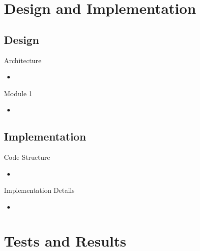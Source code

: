 \documentclass{beamer}
\begin{document}
\section{Design and Implementation}

\subsection{Design}

\begin{frame}{Architecture}
	\begin{itemize}
		\item 
	\end{itemize}


\end{frame}

\begin{frame}{Module 1}
	\begin{itemize}
		\item 
	\end{itemize}    
\end{frame}


\subsection{Implementation}

\begin{frame}{Code Structure}
	\begin{itemize}
		\item 
	\end{itemize}    
\end{frame}

\begin{frame}{Implementation Details}
	\begin{itemize}
		\item 
	\end{itemize}    
\end{frame}


\section{Tests and Results}
\end{document}
